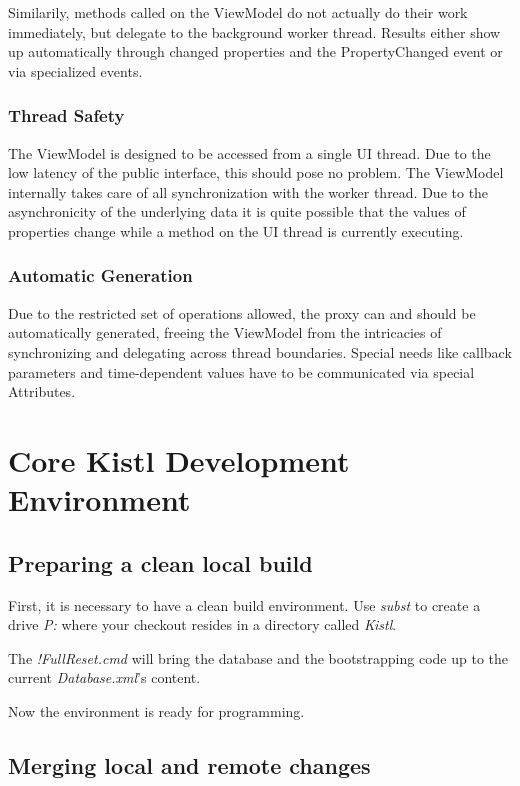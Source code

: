 Similarily, methods called on the ViewModel do not actually do their work
immediately, but delegate to the background worker thread. Results either show
up automatically through changed properties and the PropertyChanged event or
via specialized events.

\subsubsection{Thread Safety}

The ViewModel is designed to be accessed from a single UI thread. Due to the
low latency of the public interface, this should pose no problem. The ViewModel
internally takes care of all synchronization with the worker thread. Due to the
asynchronicity of the underlying data it is quite possible that the values of
properties change while a method on the UI thread is currently executing.

\subsubsection{Automatic Generation}

Due to the restricted set of operations allowed, the proxy can and should be
automatically generated, freeing the ViewModel from the intricacies of
synchronizing and delegating across thread boundaries. Special needs like
callback parameters and time-dependent values have to be communicated via
special Attributes.

\section{Core Kistl Development Environment}

\subsection{Preparing a clean local build}

First, it is necessary to have a clean build environment. Use
\emph{subst} to create a drive \emph{P:} where your checkout
resides in a directory called \emph{Kistl}.

The \emph{!FullReset.cmd} will bring the database and the bootstrapping
code up to the current \emph{Database.xml}'s content.

Now the environment is ready for programming.

\subsection{Merging local and remote changes}

